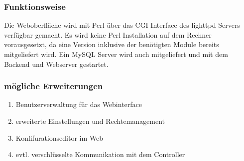 \documentclass[12pt,a4paper]{article}
\begin{document}
\subsubsection{Funktionsweise}

Die Weboberfläche wird mit Perl über das CGI Interface des lighttpd Servers verfügbar gemacht. Es wird keine Perl Installation auf dem Rechner vorausgesetzt, da eine Version inklusive der benötigten Module bereits mitgeliefert wird. Ein MySQL Server wird auch mitgeliefert und mit dem Backend und Webserver gestartet.


\subsubsection{mögliche Erweiterungen}

\begin{enumerate}
	\item Benutzerverwaltung für das Webinterface
	\item erweiterte Einstellungen und Rechtemanagement
	\item Konfifurationseditor im Web
	\item evtl. verschlüsselte Kommunikation mit dem Controller
\end{enumerate}
\end{document}
